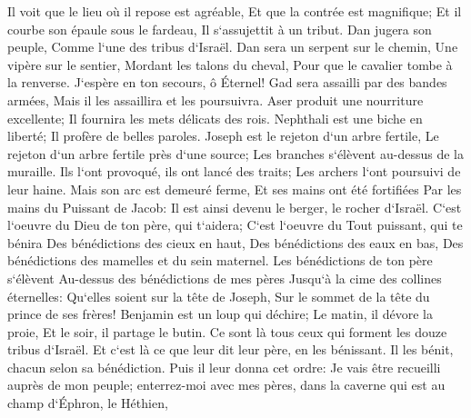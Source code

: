 \verse Il voit que le lieu où il repose est agréable, Et que la contrée est magnifique; Et il courbe son épaule sous le fardeau, Il s`assujettit à un tribut. 
\verse Dan jugera son peuple, Comme l`une des tribus d`Israël. 
\verse Dan sera un serpent sur le chemin, Une vipère sur le sentier, Mordant les talons du cheval, Pour que le cavalier tombe à la renverse. 
\verse J`espère en ton secours, ô Éternel! 
\verse Gad sera assailli par des bandes armées, Mais il les assaillira et les poursuivra. 
\verse Aser produit une nourriture excellente; Il fournira les mets délicats des rois. 
\verse Nephthali est une biche en liberté; Il profère de belles paroles. 
\verse Joseph est le rejeton d`un arbre fertile, Le rejeton d`un arbre fertile près d`une source; Les branches s`élèvent au-dessus de la muraille. 
\verse Ils l`ont provoqué, ils ont lancé des traits; Les archers l`ont poursuivi de leur haine. 
\verse Mais son arc est demeuré ferme, Et ses mains ont été fortifiées Par les mains du Puissant de Jacob: Il est ainsi devenu le berger, le rocher d`Israël. 
\verse C`est l`oeuvre du Dieu de ton père, qui t`aidera; C`est l`oeuvre du Tout puissant, qui te bénira Des bénédictions des cieux en haut, Des bénédictions des eaux en bas, Des bénédictions des mamelles et du sein maternel. 
\verse Les bénédictions de ton père s`élèvent Au-dessus des bénédictions de mes pères Jusqu`à la cime des collines éternelles: Qu`elles soient sur la tête de Joseph, Sur le sommet de la tête du prince de ses frères! 
\verse Benjamin est un loup qui déchire; Le matin, il dévore la proie, Et le soir, il partage le butin. 
\verse Ce sont là tous ceux qui forment les douze tribus d`Israël. Et c`est là ce que leur dit leur père, en les bénissant. Il les bénit, chacun selon sa bénédiction. 
\verse Puis il leur donna cet ordre: Je vais être recueilli auprès de mon peuple; enterrez-moi avec mes pères, dans la caverne qui est au champ d`Éphron, le Héthien, 
